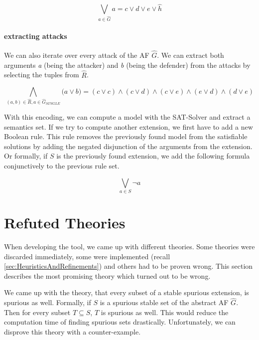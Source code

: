 \begin{example}
$$
\bigvee_{a \in \hat{G}} a = c \lor d \lor e \lor \hat{h}
$$

\paragraph{extracting attacks} We can also iterate over every attack of the AF $\hat{G}$. We can extract both arguments \emph{a} (being the attacker) and \emph{b} (being the defender) from the attacks by selecting the tuples from \emph{$\hat{R}$}.

$$
\bigwedge_{(a, b) \in \hat{R}, a\in \hat{G}_{\!S\!I\!N\!G\!L\!E}} \big( a \lor b \big) = (c \lor c) \land
(c \lor d) \land (c \lor e) \land (e \lor d) \land (d \lor e)
$$
\end{example}

With this encoding, we can compute a model with the SAT-Solver and extract a semantics set. If we try to compute another extension, we first have to add a new Boolean rule. This rule removes the previously found model from the satisfiable solutions by adding the negated disjunction of the arguments from the extension. Or formally, if $S$ is the previously found extension, we add the following formula conjunctively to the previous rule set.

$$
\bigvee_{a \in S} \lnot a
$$


\section{Refuted Theories}
\label{sec:ImplementationsRefutedTheories}

When developing the tool, we came up with different theories. Some theories were discarded immediately, some were implemented (recall \cref{sec:HeuristicsAndRefinements}) and others had to be proven wrong. This section describes the most promising theory which turned out to be wrong.

We came up with the theory, that every subset of a stable spurious extension, is spurious as well. Formally, if $S$ is a spurious stable set of the abstract AF $\hat{G}$. Then for every subset $T \subseteq S$, $T$ is spurious as well. This would reduce the computation time of finding spurious sets drastically. Unfortunately, we can disprove this theory with a counter-example.

